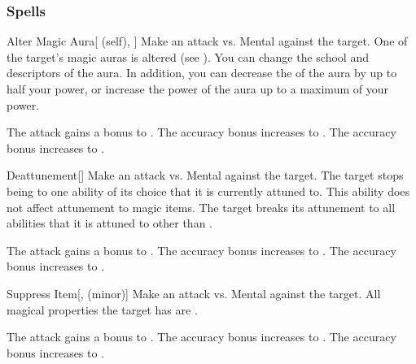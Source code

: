 \subsubsection{Spells}


\lowercase{\hypertarget{spell:Alter Magic Aura}{}}\label{spell:Alter Magic Aura}
\begin{attuneability}[Rank 1]{\hypertarget{spell:Alter Magic Aura}{Alter Magic Aura}}[ (self), ]
Make an attack vs. Mental against the target.
\hit One of the target's magic auras is altered (see ).
You can change the school and descriptors of the aura.
In addition, you can decrease the  of the aura by up to half your power, or increase the power of the aura up to a maximum of your power.

\rankline
{} The attack gains a  bonus to .
 The accuracy bonus increases to .
 The accuracy bonus increases to .
\end{attuneability}
\vspace{0.25em}



\lowercase{\hypertarget{spell:Deattunement}{}}\label{spell:Deattunement}
\begin{freeability}[Rank 1]{\hypertarget{spell:Deattunement}{Deattunement}}[]
Make an attack vs. Mental against the target.
\hit The target stops being  to one ability of its choice that it is currently attuned to.
This ability does not affect attunement to magic items.
\crit The target breaks its attunement to all abilities that it is attuned to other than .

\rankline
{} The attack gains a  bonus to .
 The accuracy bonus increases to .
 The accuracy bonus increases to .
\end{freeability}
\vspace{0.25em}



\lowercase{\hypertarget{spell:Suppress Item}{}}\label{spell:Suppress Item}
\begin{freeability}[Rank 1]{\hypertarget{spell:Suppress Item}{Suppress Item}}[,  (minor)]
Make an attack vs. Mental against the target.
\hit All magical properties the target has are .

\rankline
{} The attack gains a  bonus to .
 The accuracy bonus increases to .
 The accuracy bonus increases to .
\end{freeability}
\vspace{0.25em}



